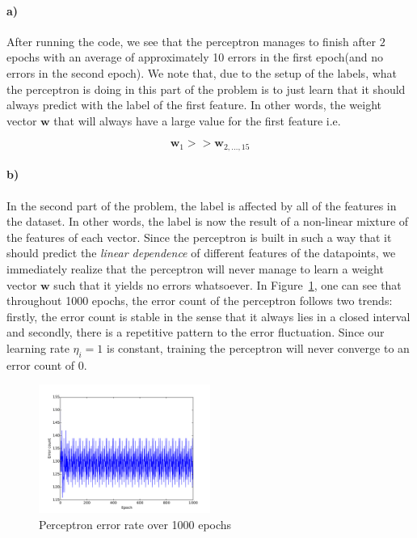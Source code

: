 \documentclass{article}
\begin{document}
\begin{table}[H]
\begin{table}[H]
\begin{table}[H]
\begin{table}[H]
\begin{table}[H]
\begin{table}[H]
\paragraph{a)}
After running the code, we see that the perceptron manages to finish after $2$ epochs with an average of approximately 10 errors in the first epoch(and no errors in the second epoch). We note that, due to the setup of the labels, what the perceptron is doing in this part of the problem is to just learn that it should always predict with the label of the first feature. In other words, the weight vector $\mathbf{w}$ that will always have a large value for the first feature i.e.

\[
\mathbf{w}_1 >> \mathbf{w}_{2,\hdots,15} 
\]

\paragraph{b)}
In the second part of the problem, the label is affected by all of the features in the dataset. In other words, the label is now the result of a non-linear mixture of the features of each vector. Since the perceptron is built in such a way that it should predict the \textit{linear dependence} of different features of the datapoints, we immediately realize that the perceptron will never manage to learn a weight vector $\mathbf{w}$ such that it yields no errors whatsoever. In Figure~\ref{fig:prcp}, one can see that throughout 1000 epochs, the error count of the perceptron follows two trends: firstly, the error count is stable in the sense that it always lies in a closed interval and secondly, there is a repetitive pattern to the error fluctuation. Since our learning rate $\eta_i=1$ is constant, training the perceptron will never converge to an error count of 0.

\begin{figure}[H]
\centering\includegraphics[width=0.5\textwidth]{prcp.pdf}
\caption{Perceptron error rate over 1000 epochs}\label{fig:prcp}
\hfill
\end{figure}


\end{table}
\end{table}
\end{table}
\end{table}
\end{table}
\end{table}
\end{document}
